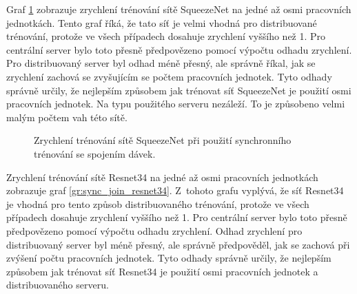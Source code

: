 Graf \ref{gr:sync_join_squeezenet} zobrazuje zrychlení trénování sítě SqueezeNet na jedné až osmi pracovních jednotkách.
Tento graf říká, že tato síť je velmi vhodná pro distribuované trénování, protože ve všech případech dosahuje zrychlení vyššího než 1.
Pro centrální server bylo toto přesně předpovězeno pomocí výpočtu odhadu zrychlení.
Pro distribuovaný server byl odhad méně přesný, ale správně říkal, jak se zrychlení zachová se zvyšujícím se počtem pracovních jednotek.
Tyto odhady správně určily, že nejlepším způsobem jak trénovat síť SqueezeNet je použití osmi pracovních jednotek.
Na typu použitého serveru nezáleží.
To je způsobeno velmi malým počtem vah této sítě.

\begin{figure}
\centering
{}
\caption{Zrychlení trénování sítě SqueezeNet při použití synchronního trénování se spojením dávek.}
\label{gr:sync_join_squeezenet}
\end{figure}

Zrychlení trénování sítě Resnet34 na jedné až osmi pracovních jednotkách zobrazuje graf \ref{gr:sync_join_resnet34}.
Z~tohoto grafu vyplývá, že síť Resnet34 je vhodná pro tento způsob distribuovaného trénování, protože ve všech případech dosahuje zrychlení vyššího než 1.
Pro centrální server bylo toto přesně předpovězeno pomocí výpočtu odhadu zrychlení.
Odhad zrychlení pro distribuovaný server byl méně přesný, ale správně předpověděl, jak se zachová při zvýšení počtu pracovních jednotek.
Tyto odhady správně určily, že nejlepším způsobem jak trénovat síť Resnet34 je použití osmi pracovních jednotek a distribuovaného serveru.

